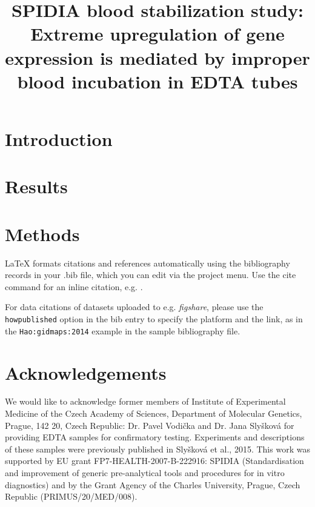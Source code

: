 \documentclass[fleqn,10pt]{wlscirep}
\title{SPIDIA blood stabilization study: Extreme upregulation of gene expression is mediated by improper blood incubation in EDTA tubes}
\begin{document}
\flushbottom
\maketitle
%
%
\thispagestyle{empty}

\noindent 

\section*{Introduction}


\section*{Results}
%
%

\section*{Methods}
%



\noindent 
LaTeX formats citations and references automatically using the bibliography records in your .bib file, which you can edit via the project menu. Use the cite command for an inline citation, e.g.  \cite{Hao:gidmaps:2014}.

For data citations of datasets uploaded to e.g. \emph{figshare}, please use the \verb|howpublished| option in the bib entry to specify the platform and the link, as in the \verb|Hao:gidmaps:2014| example in the sample bibliography file.

\section*{Acknowledgements}

We would like to acknowledge former members of Institute of Experimental Medicine of the Czech Academy of Sciences, Department of Molecular Genetics, Prague, 142 20, Czech Republic: Dr. Pavel Vodička and Dr. Jana Slyšková for providing EDTA samples for confirmatory testing. Experiments and descriptions of these samples were previously published in Slyšková et al., 2015.
This work was supported by EU grant FP7-HEALTH-2007-B-222916: SPIDIA (Standardisation and improvement of generic pre-analytical tools and procedures for in vitro diagnostics) and by the Grant Agency of the Charles University, Prague, Czech Republic (PRIMUS/20/MED/008). 
\end{document}
